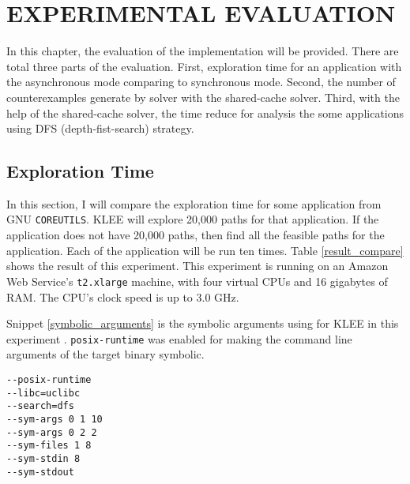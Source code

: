 \chapter{EXPERIMENTAL EVALUATION}%

In this chapter, the evaluation of the implementation will be provided. There are total three parts of the evaluation. First, exploration time for an application with the asynchronous mode comparing to synchronous mode. Second, the number of counterexamples generate by solver with the shared-cache solver. Third, with the help of the shared-cache solver, the time reduce for analysis the some applications using DFS (depth-fist-search) strategy.

\section{Exploration Time}

In this section, I will compare the exploration time for some application from GNU \texttt{COREUTILS}. KLEE will explore 20,000 paths for that application. If the application does not have 20,000 paths, then find all the feasible paths for the application. Each of the application will be run ten times. Table \ref{result_compare} shows the result of this experiment. This experiment is running on an Amazon Web Service's \texttt{t2.xlarge} machine, with four virtual CPUs and 16 gigabytes of RAM. The CPU's clock speed is up to 3.0 GHz. 

Snippet \ref{symbolic_arguments} is the symbolic arguments using for KLEE in this experiment \cite{Cadar:2008:KUA:1855741.1855756}. \texttt{posix-runtime} was enabled for making the command line arguments of the target binary symbolic.

\begin{spacing}{1}
{
\begin{lstlisting}[frame=shadowbox, caption={Symbolic Arguments},label={symbolic_arguments}]
--posix-runtime
--libc=uclibc
--search=dfs
--sym-args 0 1 10
--sym-args 0 2 2
--sym-files 1 8
--sym-stdin 8
--sym-stdout
\end{lstlisting}
}
\end{spacing}

